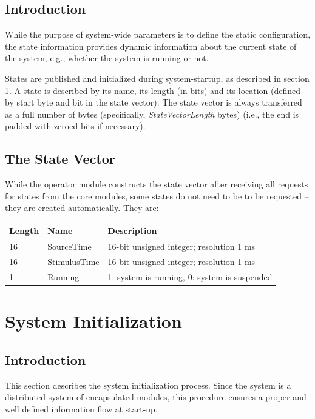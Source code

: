 \documentclass[letterpaper,oneside,12pt]{book}
\begin{document}
\subsection{Introduction}

While the purpose of system-wide parameters is to define the static 
configuration, the state information provides dynamic information about the 
current state of the system, e.g., whether the system is running or not.

States are published and initialized during system-startup, as described in 
section \ref{system_init}. A state is described by its name, its length (in 
bits) and its location (defined by start byte and bit in the state vector). 
The state vector is always transferred as a full number of bytes (specifically, 
\textit{StateVectorLength} bytes) (i.e., the end is padded with zeroed 
bits if necessary).

\subsection{The State Vector}

While the operator module constructs the state vector after receiving 
all requests for states from the core modules, some states do not need to be
to be requested -- they are created automatically. They are:
\\[2ex]
\begin{tabular}{|l|l|l|}
 \hline
 \textbf{Length} & \textbf{Name} & \textbf{Description}\\
 \hline
 16 & SourceTime & 16-bit unsigned integer; resolution 1 ms \\  
 \hline
 16 & StimulusTime & 16-bit unsigned integer; resolution 1 ms \\  
 \hline
 1 & Running & 1: system is running, 0: system is suspended\\  
 \hline
\end{tabular}


\section{System Initialization}
\label{system_init}

\subsection{Introduction}

This section describes the system initialization process. Since the system is a 
distributed system of encapsulated modules, this procedure ensures a proper and 
well defined information flow at start-up.
\end{document}
